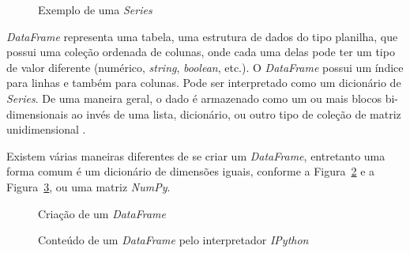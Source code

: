 \begin{figure}[h!]
	\centering
	\vspace{0.1cm}
	\caption{Exemplo de uma \textit{Series}}
	\label{pandas-series}
\end{figure}

\textit{DataFrame} representa uma tabela, uma estrutura de dados do tipo planilha, que possui uma coleção ordenada de colunas, onde cada uma delas pode ter um tipo de valor diferente (numérico, \textit{string}, \textit{boolean}, etc.). O \textit{DataFrame} possui um índice para linhas e também para colunas. Pode ser interpretado como um dicionário de \textit{Series}. De uma maneira geral, o dado é armazenado como um ou mais blocos bi-dimensionais ao invés de uma lista, dicionário, ou outro tipo de coleção de matriz unidimensional \cite{python-analysis}.

Existem várias maneiras diferentes de se criar um \textit{DataFrame}, entretanto uma forma comum é um dicionário de dimensões iguais, conforme a Figura~\ref{pandas-dataframe} e a Figura~\ref{pandas-dataframe2}, ou uma matriz \textit{NumPy}.

\begin{figure}[h!]
	\centering
	\vspace{0.1cm}
	\caption{Criação de um \textit{DataFrame}}
	\label{pandas-dataframe}
\end{figure}

\begin{figure}[h!]
	\centering
    \vspace{0.1cm}
	\caption{Conteúdo de um \textit{DataFrame} pelo interpretador \textit{IPython}}
	\label{pandas-dataframe2}
\end{figure}

